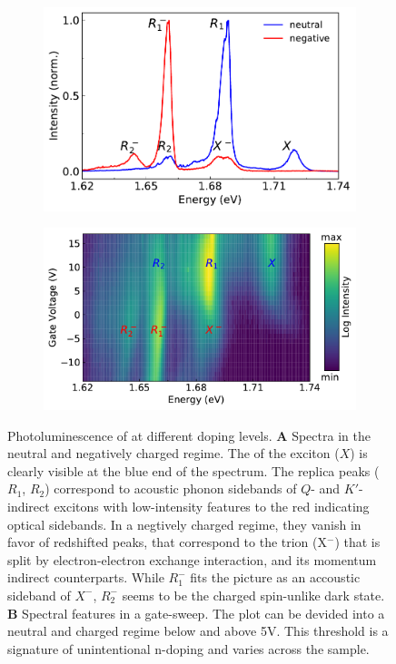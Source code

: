 \begin{figure}[t]
	\begin{subfigure}{0.49\textwidth}
		\caption{}
		\includegraphics[height=0.65\textwidth]{spectrum_neutral_negative}
	\end{subfigure}
	\begin{subfigure}{0.49\textwidth}
		\caption{}
		\includegraphics[height=0.65\textwidth]{Voltsweep}
	\end{subfigure}
	\caption{Photoluminescence of \wse at different doping levels. \textbf{A} Spectra in the neutral and negatively charged regime. The \pl of the exciton ($X$) is clearly visible at the blue end of the spectrum. The replica peaks ($R_1$, $R_2$) correspond to acoustic phonon sidebands of $Q$- and $K'$-indirect excitons with low-intensity features to the red indicating optical sidebands. In a negtively charged regime, they vanish in favor of redshifted peaks, that correspond to the trion (X$^-$) that is split by electron-electron exchange interaction, and its momentum indirect counterparts. While $R^-_1$ fits the picture as an accoustic sideband of $X^-$, $R^-_2$ seems to be the charged spin-unlike dark state. \textbf{B} Spectral features in a gate-sweep. The plot can be devided into a neutral and charged regime below and above 5V. This threshold is a signature of unintentional n-doping and varies across the sample.}\label{plspectrum}
\end{figure} 

